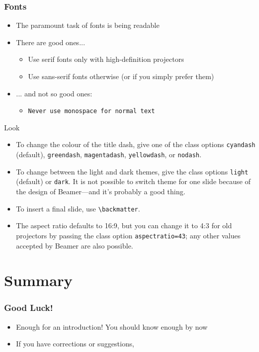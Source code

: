 \documentclass[10pt,aspectratio=169]{beamer}
\begin{document}
\begin{frame}[fragile]
\frametitle{Fonts}
\begin{itemize}
\item The paramount task of fonts is being readable
\item There are good ones...
  \begin{itemize}
  \item {\textrm{Use serif fonts only with high-definition projectors}}
  \item {\textsf{Use sans-serif fonts otherwise (or if you simply prefer them)}}
  \end{itemize}
\item ... and not so good ones:
  \begin{itemize}
  \item {\texttt{Never use monospace for normal text}}
\end{itemize}
\end{itemize}
\end{frame}

\begin{frame}[fragile]{Look}
\begin{itemize}
\item To change the colour of the title dash, give one of the class options
      \texttt{cyandash} (default), \texttt{greendash}, \texttt{magentadash},
      \texttt{yellowdash}, or \texttt{nodash}.
\item To change between the light and dark themes, give the class options
      \texttt{light} (default) or \texttt{dark}. It is not possible to switch
      theme for one slide because of the design of Beamer---and it's probably a
      good thing.
\item To insert a final slide, use \verb|\backmatter|.
\item The aspect ratio defaults to 16:9, but you can change it to 4:3 for old
      projectors by passing the class option \texttt{aspectratio=43}; any other
      values accepted by Beamer are also possible.
\end{itemize}
\end{frame}

\section{Summary}

\begin{frame}
\frametitle{Good Luck!}
\begin{itemize}
\item Enough for an introduction! You should know enough by now
\item If you have corrections or suggestions,
\end{itemize}
\end{frame}

\end{document}
